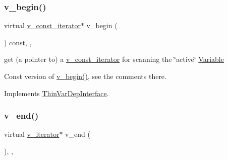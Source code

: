 \subsubsection{\texorpdfstring{v\+\_\+begin()}{v\_begin()}\hspace{0.1cm}{\footnotesize\ttfamily [2/2]}}
{\footnotesize\ttfamily virtual \mbox{\hyperlink{class_s_m_spp__di__unipi__it_1_1_one_var_constraint_1_1v__const__iterator}{v\+\_\+const\+\_\+iterator}}$\ast$ v\+\_\+begin (\begin{DoxyParamCaption}\item[{void}]{ }\end{DoxyParamCaption}) const\hspace{0.3cm}{\ttfamily [inline]}, {\ttfamily [override]}, {\ttfamily [virtual]}}



get (a pointer to) a \mbox{\hyperlink{class_s_m_spp__di__unipi__it_1_1_one_var_constraint_1_1v__const__iterator}{v\+\_\+const\+\_\+iterator}} for scanning the \char`\"{}active\char`\"{} \mbox{\hyperlink{class_s_m_spp__di__unipi__it_1_1_variable}{Variable}} 

Const version of \mbox{\hyperlink{class_s_m_spp__di__unipi__it_1_1_one_var_constraint_ad0b5bcf42a678385fdba6fe41ce9626b}{v\+\_\+begin()}}, see the comments there. 

Implements \mbox{\hyperlink{group___thin_var_dep_interface___c_l_a_s_s_e_s_ga6179496ecb66b6cc1504a50bcbb264e9}{Thin\+Var\+Dep\+Interface}}.

\mbox{\label{class_s_m_spp__di__unipi__it_1_1_one_var_constraint_ad17303c6335cb94a9d32f1fce77501fd}} 
\subsubsection{\texorpdfstring{v\+\_\+end()}{v\_end()}\hspace{0.1cm}{\footnotesize\ttfamily [1/2]}}
{\footnotesize\ttfamily virtual \mbox{\hyperlink{class_s_m_spp__di__unipi__it_1_1_one_var_constraint_1_1v__iterator}{v\+\_\+iterator}}$\ast$ v\+\_\+end (\begin{DoxyParamCaption}\item[{void}]{ }\end{DoxyParamCaption})\hspace{0.3cm}{\ttfamily [inline]}, {\ttfamily [override]}, {\ttfamily [virtual]}}



